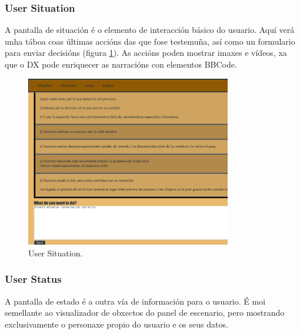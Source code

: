 \subsubsection{User Situation}
A pantalla de situación é o elemento de interacción básico do usuario. Aquí verá
unha táboa coas últimas accións das que fose testemuña, así como un formulario
para enviar decisións (figura \ref{fig:demiurgosituation}). As accións
poden mostrar imaxes e vídeos, xa que o DX pode enriquecer as narracións con
elementos BBCode.

\begin{figure}
\centerline{\includegraphics[width=0.8\textwidth]{figuras/demiurgo_situation.png}}
\caption{User Situation.}
\label{fig:demiurgosituation}
\end{figure}

\subsubsection{User Status}
A pantalla de estado é a outra vía de información para o usuario. É moi
semellante ao visualizador de obxectos do panel de escenario, pero mostrando
exclusivamente o personaxe propio do usuario e os seus datos.
